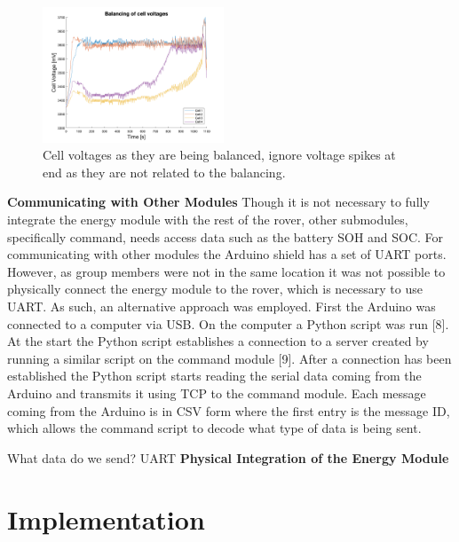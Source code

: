 \documentclass[a4paper]{article}
\begin{document}
\begin{figure}[H]
    \centering
    \includegraphics[width=0.48\textwidth]{balancing.png}
    \caption{Cell voltages as they are being balanced, ignore voltage spikes at end as they are not related to the balancing.}
    \label{fig:balancing}
\end{figure}

\textbf{Communicating with Other Modules}
\vspace{10pt} 
\newline
Though it is not necessary to fully integrate the energy module with the rest of 
the rover, other submodules, specifically command, needs access data such as the 
battery SOH and SOC. For communicating with other modules the Arduino shield has 
a set of UART ports. However, as group members were not in the same location it 
was not possible to physically connect the energy module to the rover, which is 
necessary to use UART. As such, an alternative approach was employed. First the 
Arduino was connected to a computer via USB. On the computer a Python script was 
run [8]. At the start the Python script establishes a connection to a server 
created by running a similar script on the command module [9]. After a 
connection has been established the Python script starts reading the serial data 
coming from the Arduino and transmits it using TCP to the command module. Each 
message coming from the Arduino is in CSV form where the first entry is the 
message ID, which allows the command script to decode what type of data is being 
sent. 

What data do we send? UART
\textbf{Physical Integration of the Energy Module}
\vspace{10pt} 
\newline




\section{Implementation}
\end{document}
